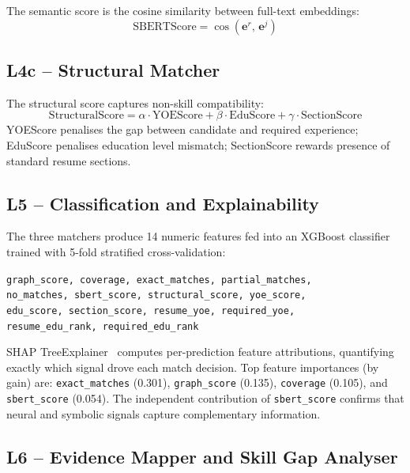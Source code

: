 \documentclass[conference]{IEEEtran}
\begin{document}
The semantic score is the cosine similarity between full-text embeddings:
\begin{equation}
  \text{SBERTScore} = \cos(\mathbf{e}^r,\, \mathbf{e}^j)
\end{equation}

\subsection{L4c -- Structural Matcher}
The structural score captures non-skill compatibility:
\begin{equation}
  \text{StructuralScore} = \alpha \cdot \text{YOEScore}
                         + \beta  \cdot \text{EduScore}
                         + \gamma \cdot \text{SectionScore}
\end{equation}
YOEScore penalises the gap between candidate and required experience;
EduScore penalises education level mismatch; SectionScore rewards presence
of standard resume sections.

\subsection{L5 -- Classification and Explainability}
The three matchers produce 14 numeric features fed into an XGBoost
classifier~\cite{chen2016xgboost} trained with 5-fold stratified
cross-validation:

\begin{center}
\footnotesize
\texttt{graph\_score, coverage, exact\_matches, partial\_matches,}\\
\texttt{no\_matches, sbert\_score, structural\_score, yoe\_score,}\\
\texttt{edu\_score, section\_score, resume\_yoe, required\_yoe,}\\
\texttt{resume\_edu\_rank, required\_edu\_rank}
\end{center}

SHAP TreeExplainer~\cite{lundberg2017shap} computes per-prediction feature
attributions, quantifying exactly which signal drove each match decision.
Top feature importances (by gain) are: \texttt{exact\_matches} (0.301),
\texttt{graph\_score} (0.135), \texttt{coverage} (0.105), and
\texttt{sbert\_score} (0.054). The independent contribution of
\texttt{sbert\_score} confirms that neural and symbolic signals capture
complementary information.

\subsection{L6 -- Evidence Mapper and Skill Gap Analyser}
\end{document}
